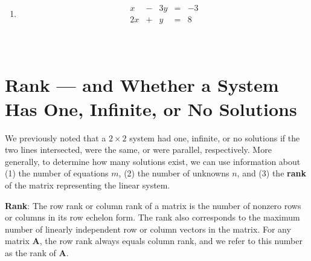 \documentclass[]{book}
\theoremstyle{definition}
\theoremstyle{definition}
\theoremstyle{definition}
\theoremstyle{remark}
\begin{document}
\begin{enumerate}
        \item  $$\begin{matrix}
            x  & - & 3y & = & -3\\
            2x & + &  y & = &  8
            \end{matrix}$$\\
            \phantom{$\begin{matrix}
            x  & - & 3y & = & -3\\
               &   & 7y & = & 14\\          
            \end{matrix}$}
            \phantom{$\begin{matrix}
            x  & - & 3y & = & -3\\
               &   & y & = & 2\\            
            \end{matrix}$}\\
            \phantom{$\begin{matrix}
            x & = & 3\\
            y & = & 2\\         
            \end{matrix}$}
        \bigskip

            
\end{enumerate}

\section{Rank --- and Whether a System Has One, Infinite, or No
Solutions}\label{rank-and-whether-a-system-has-one-infinite-or-no-solutions}

We previously noted that a \(2\times 2\) system had one, infinite, or no
solutions if the two lines intersected, were the same, or were parallel,
respectively. More generally, to determine how many solutions exist, we
can use information about (1) the number of equations \(m\), (2) the
number of unknowns \(n\), and (3) the \textbf{rank} of the matrix
representing the linear system.

\textbf{Rank}: The row rank or column rank of a matrix is the number of
nonzero rows or columns in its row echelon form. The rank also
corresponds to the maximum number of linearly independent row or column
vectors in the matrix. For any matrix \textbf{A}, the row rank always
equals column rank, and we refer to this number as the rank of
\textbf{A}.
\end{document}
